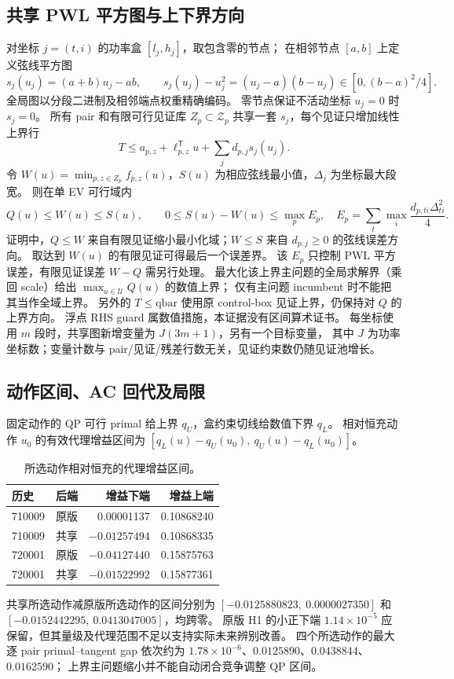 \subsection{共享 PWL 平方图与上下界方向}
对坐标 $j=(t,i)$ 的功率盒 $[l_j,h_j]$，取包含零的节点；
在相邻节点 $[a,b]$ 上定义弦线平方图
\begin{equation}
 s_j(u_j)=(a+b)u_j-ab,
 \qquad s_j(u_j)-u_j^2=(u_j-a)(b-u_j)\in[0,(b-a)^2/4].
\end{equation}
全局图以分段二进制及相邻端点权重精确编码。
零节点保证不活动坐标 $u_j=0$ 时 $s_j=0$。
所有 pair 和有限可行见证库 $Z_p\subset\mathcal Z_p$ 共享一套 $s_j$，每个见证只增加线性上界行
\begin{equation}
 T\le a_{p,z}+\ell_{p,z}^{\mathsf T}u+\sum_jd_{p,j}s_j(u_j).
\end{equation}
令 $W(u)=\min_{p,z\in Z_p}f_{p,z}(u)$，$S(u)$ 为相应弦线最小值，$\Delta_j$ 为坐标最大段宽。
则在单 EV 可行域内
\begin{equation}
 Q(u)\le W(u)\le S(u),\qquad
 0\le S(u)-W(u)\le\max_p E_p,
 \quad E_p=\sum_t\max_i\frac{d_{p,ti}\Delta_{ti}^2}{4}.
\end{equation}
证明中，$Q\le W$ 来自有限见证缩小最小化域；$W\le S$ 来自 $d_{p,j}\ge0$ 的弦线误差方向。
取达到 $W(u)$ 的有限见证可得最后一个误差界。
该 $E_p$ 只控制 PWL 平方误差，有限见证误差 $W-Q$ 需另行处理。
最大化该上界主问题的全局求解界（乘回 scale）给出 $\max_{u\in\mathcal U}Q(u)$ 的数值上界；
仅有主问题 incumbent 时不能把其当作全域上界。
另外的 $T\le\mathrm{qbar}$ 使用原 control-box 见证上界，仍保持对 $Q$ 的上界方向。
浮点 RHS guard 属数值措施，本证据没有区间算术证书。
每坐标使用 $m$ 段时，共享图新增变量为 $J(3m+1)$，另有一个目标变量，
其中 $J$ 为功率坐标数；变量计数与 pair/见证/残差行数无关，见证约束数仍随见证池增长。

\subsection{动作区间、AC 回代及局限}
固定动作的 QP 可行 primal 给上界 $q_U$，盒约束切线给数值下界 $q_L$。
相对恒充动作 $u_0$ 的有效代理增益区间为
$[q_L(u)-q_U(u_0),\ q_U(u)-q_L(u_0)]$。
\begin{table}[htbp]
\centering\small
\caption{所选动作相对恒充的代理增益区间。}
\label{tab:shared-upper-gain}
\begin{tabular}{llrr}
\hline
历史 & 后端 & 增益下端 & 增益上端 \\
\hline
710009 & 原版 & 0.00001137 & 0.10868240 \\
710009 & 共享 & $-0.01257494$ & 0.10868335 \\
720001 & 原版 & $-0.04127440$ & 0.15875763 \\
720001 & 共享 & $-0.01522992$ & 0.15877361 \\
\hline
\end{tabular}
\end{table}
共享所选动作减原版所选动作的区间分别为
$[-0.0125880823,\ 0.0000027350]$ 和 $[-0.0152442295,\ 0.0413047005]$，均跨零。
原版 H1 的小正下端 $1.14\times10^{-5}$ 应保留，但其量级及代理范围不足以支持实际未来辨别改善。
四个所选动作的最大逐 pair primal--tangent gap 依次约为
$1.78\times10^{-6}$、$0.0125890$、$0.0438844$、$0.0162590$；
上界主问题缩小并不能自动闭合竞争调整 QP 区间。


